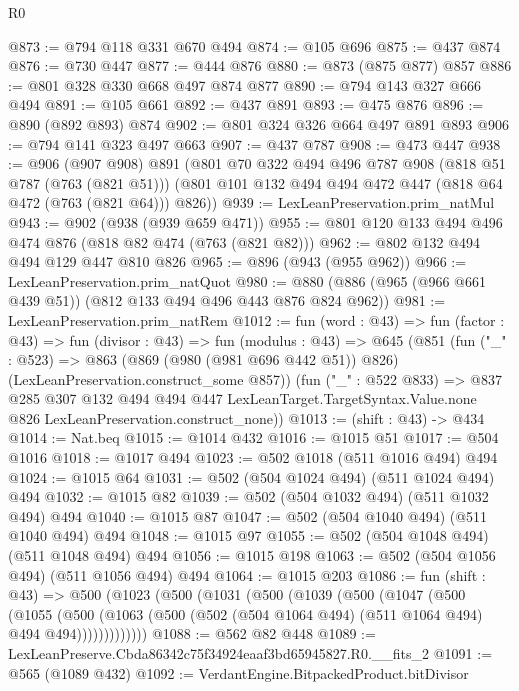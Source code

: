 \begin{lexlean}{R0}
\begin{coremodule}
@873 := @794 @118 @331 @670 @494
@874 := @105 @696
@875 := @437 @874
@876 := @730 @447
@877 := @444 @876
@880 := @873 (@875 @877) @857
@886 := @801 @328 @330 @668 @497 @874 @877
@890 := @794 @143 @327 @666 @494
@891 := @105 @661
@892 := @437 @891
@893 := @475 @876
@896 := @890 (@892 @893) @874
@902 := @801 @324 @326 @664 @497 @891 @893
@906 := @794 @141 @323 @497 @663
@907 := @437 @787
@908 := @473 @447
@938 := @906
    (@907 @908)
    @891
    (@801
      @70
      @322
      @494
      @496
      @787
      @908
      (@818 @51 @787 (@763 (@821 @51)))
      (@801 @101 @132 @494 @494 @472 @447 (@818 @64 @472 (@763 (@821 @64))) @826))
@939 := LexLeanPreservation.prim_natMul
@943 := @902 (@938 (@939 @659 @471))
@955 := @801 @120 @133 @494 @496 @474 @876 (@818 @82 @474 (@763 (@821 @82)))
@962 := @802 @132 @494 @494 @129 @447 @810 @826
@965 := @896 (@943 (@955 @962))
@966 := LexLeanPreservation.prim_natQuot
@980 := @880 (@886 (@965 (@966 @661 @439 @51)) (@812 @133 @494 @496 @443 @876 @824 @962))
@981 := LexLeanPreservation.prim_natRem
@1012 := fun (word : @43) =>
  fun (factor : @43) =>
  fun (divisor : @43) =>
  fun (modulus : @43) =>
  @645
    (@851
      (fun ("_" : @523) =>
      @863 (@869 (@980 (@981 @696 @442 @51)) @826) (LexLeanPreservation.construct_some @857))
      (fun ("_" : @522 @833) =>
      @837
        @285
        @307
        @132
        @494
        @494
        @447
        LexLeanTarget.TargetSyntax.Value.none
        @826
        LexLeanPreservation.construct_none))
@1013 := (shift : @43) -> @434
@1014 := Nat.beq
@1015 := @1014 @432
@1016 := @1015 @51
@1017 := @504 @1016
@1018 := @1017 @494
@1023 := @502 @1018 (@511 @1016 @494) @494
@1024 := @1015 @64
@1031 := @502 (@504 @1024 @494) (@511 @1024 @494) @494
@1032 := @1015 @82
@1039 := @502 (@504 @1032 @494) (@511 @1032 @494) @494
@1040 := @1015 @87
@1047 := @502 (@504 @1040 @494) (@511 @1040 @494) @494
@1048 := @1015 @97
@1055 := @502 (@504 @1048 @494) (@511 @1048 @494) @494
@1056 := @1015 @198
@1063 := @502 (@504 @1056 @494) (@511 @1056 @494) @494
@1064 := @1015 @203
@1086 := fun (shift : @43) =>
  @500
    (@1023
      (@500
        (@1031
          (@500
            (@1039
              (@500
                (@1047
                  (@500
                    (@1055
                      (@500
                        (@1063
                          (@500 (@502 (@504 @1064 @494) (@511 @1064 @494) @494 @494)))))))))))))
@1088 := @562 @82 @448
@1089 := LexLeanPreserve.Cbda86342c75f34924eaaf3bd65945827.R0.__fits_2
@1091 := @565 (@1089 @432)
@1092 := VerdantEngine.BitpackedProduct.bitDivisor

\end{coremodule}
\end{lexlean}
